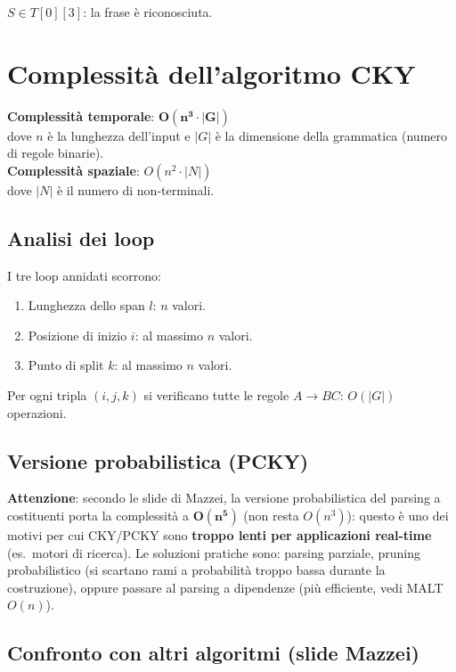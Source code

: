 \documentclass[12pt,a4paper]{article}
\begin{document}
$S \in T[0][3]$: la frase è riconosciuta.

\section{Complessità dell'algoritmo CKY}

\begin{defbox}
\textbf{Complessità temporale}: $\boldsymbol{O(n^3 \cdot |G|)}$\\
dove $n$ è la lunghezza dell'input e $|G|$ è la dimensione della grammatica (numero di regole binarie).\\[4pt]
\textbf{Complessità spaziale}: $O(n^2 \cdot |N|)$\\
dove $|N|$ è il numero di non-terminali.
\end{defbox}

\subsection{Analisi dei loop}

I tre loop annidati scorrono:
\begin{enumerate}[leftmargin=1.5em, label=\arabic*.]
  \item Lunghezza dello span $l$: $n$ valori.
  \item Posizione di inizio $i$: al massimo $n$ valori.
  \item Punto di split $k$: al massimo $n$ valori.
\end{enumerate}
Per ogni tripla $(i,j,k)$ si verificano tutte le regole $A \to BC$: $O(|G|)$ operazioni.

\subsection{Versione probabilistica (PCKY)}

\textbf{Attenzione}: secondo le slide di Mazzei, la versione probabilistica del parsing a costituenti porta la complessità a $\boldsymbol{O(n^5)}$ (non resta $O(n^3)$): questo è uno dei motivi per cui CKY/PCKY sono \textbf{troppo lenti per applicazioni real-time} (es.\ motori di ricerca). Le soluzioni pratiche sono: parsing parziale, pruning probabilistico (si scartano rami a probabilità troppo bassa durante la costruzione), oppure passare al parsing a dipendenze (più efficiente, vedi MALT $O(n)$).

\subsection{Confronto con altri algoritmi (slide Mazzei)}
\end{document}
